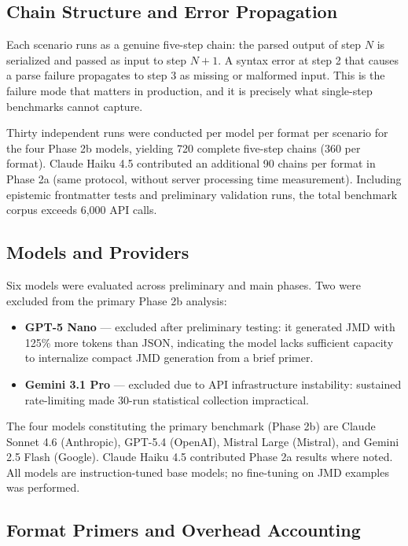 \documentclass[11pt]{article}
\begin{document}
\subsection{Chain Structure and Error Propagation}

Each scenario runs as a genuine five-step chain: the parsed output of step $N$ is serialized and passed as input to step $N+1$. A syntax error at step 2 that causes a parse failure propagates to step 3 as missing or malformed input. This is the failure mode that matters in production, and it is precisely what single-step benchmarks cannot capture.

Thirty independent runs were conducted per model per format per scenario for the four Phase 2b models, yielding 720 complete five-step chains (360 per format). Claude Haiku 4.5 contributed an additional 90 chains per format in Phase 2a (same protocol, without server processing time measurement). Including epistemic frontmatter tests and preliminary validation runs, the total benchmark corpus exceeds 6,000 API calls.

\subsection{Models and Providers}

Six models were evaluated across preliminary and main phases. Two were excluded from the primary Phase 2b analysis:

\begin{itemize}
  \item \textbf{GPT-5 Nano} --- excluded after preliminary testing: it generated JMD with 125\% more tokens than JSON, indicating the model lacks sufficient capacity to internalize compact JMD generation from a brief primer.
  \item \textbf{Gemini 3.1 Pro} --- excluded due to API infrastructure instability: sustained rate-limiting made 30-run statistical collection impractical.
\end{itemize}

The four models constituting the primary benchmark (Phase 2b) are Claude Sonnet 4.6 (Anthropic), GPT-5.4 (OpenAI), Mistral Large (Mistral), and Gemini 2.5 Flash (Google). Claude Haiku 4.5 contributed Phase 2a results where noted. All models are instruction-tuned base models; no fine-tuning on JMD examples was performed.

\subsection{Format Primers and Overhead Accounting}
\end{document}
